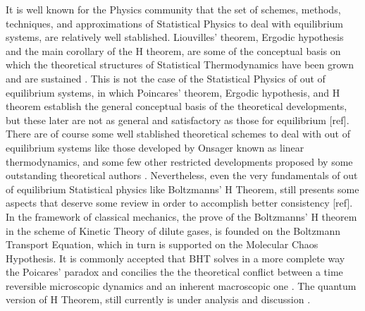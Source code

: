 \documentclass{article}
\begin{document}
It is well known for the Physics community that the set of schemes, methods, techniques, and approximations of Statistical Physics to deal with equilibrium systems, are relatively well stablished. Liouvilles' theorem, Ergodic hypothesis and the main corollary of the H theorem, are some of the conceptual basis on which the theoretical structures of Statistical Thermodynamics have been grown and are sustained \cite{huang, reif, patrick}. This is not the case of the Statistical Physics of out of equilibrium systems, in which Poincares' theorem, Ergodic hypothesis, and H theorem establish the general conceptual basis of the theoretical developments, but these later are not as general and satisfactory as those for equilibrium [ref]. There are of course some well stablished theoretical schemes to deal with out of equilibrium systems like those developed by Onsager known as linear thermodynamics, and some few other restricted developments proposed by some outstanding theoretical authors \cite{kei, onsager}. Nevertheless, even the very fundamentals of out of equilibrium Statistical physics like Boltzmanns' H Theorem, still presents some aspects that deserve some review in order to accomplish better consistency [ref]. In the framework of classical mechanics, the prove of the Boltzmanns' H theorem in the scheme of Kinetic Theory of dilute gases, is founded on the Boltzmann Transport  Equation, which in turn is supported on the Molecular Chaos Hypothesis. 
It is commonly accepted that BHT solves in a more complete way the Poicares' paradox and concilies the the theoretical conflict between a time reversible microscopic dynamics and an inherent macroscopic one \cite{paradox1, paradox2}. The quantum version of H Theorem, still currently is under analysis and discussion \cite{quantum1, quantum2, quantum3, quantum4}.

\end{document}
